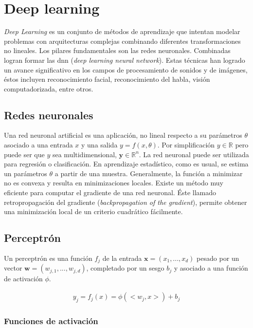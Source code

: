 \chapter{Deep learning} \label{ch:deep-learning}

\indent \textit{Deep Learning} es un conjunto de métodos de aprendizaje que intentan modelar problemas con
arquitecturas complejas combinando diferentes transformaciones no lineales. Los pilares fundamentales son las redes
neuronales. Combinadas logran formar las \acrshort{dnn} (\textit{deep learning neural network}).
\indent Estas técnicas han logrado un avance significativo en los campos de procesamiento de sonidos y de imágenes,
éstos incluyen reconocimiento facial, reconocimiento del habla, visión computadorizada, entre otros.

\section{Redes neuronales}

\indent Una red neuronal artificial es una aplicación, no lineal respecto a su parámetros $\theta$ asociado a una
entrada $x$ y una salida $y = f(x,\theta)$. Por simplificación $y \in \mathbb{R}$ pero puede ser que $y$ sea
multidimensional, $\textbf{y} \in \mathbb{R}^n$. La red neuronal puede ser utilizada para regresión o clasificación.
En aprendizaje estadístico, como es usual, se estima un parámetros $\theta$ a partir de una muestra. Generalmente,
la función a minimizar no es convexa y resulta en minimizaciones locales. Existe un método muy eficiente para
computar el gradiente de una red neuronal. Éste llamado retropropagación del gradiente (\textit{backpropagation of
the gradient}), permite obtener una minimización local de un criterio cuadrático fácilmente.

\section{Perceptrón}

\indent Un perceptrón es una función $f_j$ de la entrada $\mathbf{x} = (x_1, ...,x_d)$ pesado por un vector
$\mathbf{w} = (w_{j,1}, ..., w_{j,d})$, completado por un sesgo $b_j$ y asociado a una función de activación $\phi$.

\begin{align}
  y_j = f_j(x) = \phi(<w_j,x>) + b_j
\end{align}

\subsection*{Funciones de activación}

